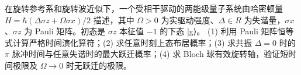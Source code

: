 在旋转参考系和旋转波近似下，一个受相干驱动的两能级量子系统由哈密顿量 \(H=\hbar (\Delta \sigma z+\Omega \sigma x)/2\) 描述，其中 \(\Omega >0\) 为实驱动强度、\(\Delta \in R\) 为失谐量，\(\sigma x\)、\(\sigma z\) 为 Pauli 矩阵。初态是 \(\sigma z\) 本征值 \(-1\) 的下态 |g⟩。
(1) 利用 Pauli 矩阵恒等式计算严格时间演化算符；(2) 求任意时刻上态布居概率；(3) 求共振 \(\Delta =0\) 时的 \(\pi \) 脉冲时间与任意失谐时的最大跃迁概率；(4) 求 Bloch 球有效旋转轴，验证短时间极限及 \(\Omega \to 0\) 时无跃迁的极限。
